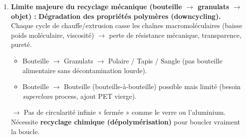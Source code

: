 \documentclass[11pt]{article}
\begin{document}
\begin{corrige}
\begin{enumerate}
    \item \textbf{Limite majeure du recyclage mécanique (bouteille $\rightarrow$ granulats $\rightarrow$ objet) :}
    \textbf{Dégradation des propriétés polymères (downcycling).} Chaque cycle de chauffe/extrusion casse les chaînes macromoléculaires (baisse poids moléculaire, viscosité) $\rightarrow$ perte de résistance mécanique, transparence, pureté. 
    \begin{itemize}
        \item Bouteille $\rightarrow$ Granulats $\rightarrow$ Polaire / Tapis / Sangle (pas bouteille alimentaire sans décontamination lourde).
        \item Bouteille $\rightarrow$ Bouteille (bouteille-à-bouteille) possible mais limité (besoin \emph{superclean} process, ajout PET vierge).
    \end{itemize}
    $\rightarrow$ Pas de circularité infinie « fermée » comme le verre ou l'aluminium. Nécessite \textbf{recyclage chimique (dépolymérisation)} pour boucler vraiment la boucle.
\end{enumerate}
\end{corrige}
\end{document}
